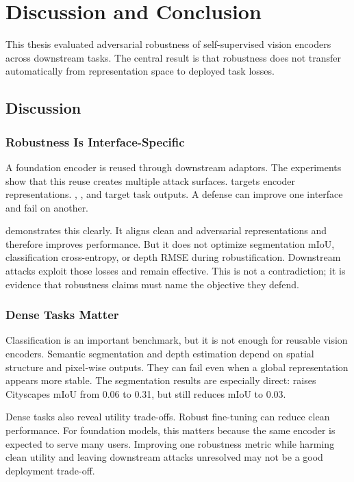 \chapter{Discussion and Conclusion}
\label{chap:discussion}

This thesis evaluated adversarial robustness of self-supervised vision encoders across downstream tasks. The central result is that robustness does not transfer automatically from representation space to deployed task losses.

\section{Discussion}

\subsection{Robustness Is Interface-Specific}

A foundation encoder is reused through downstream adaptors. The experiments show that this reuse creates multiple attack surfaces. \EmbedAttack targets encoder representations. \PGD, \SegPGD, and \DepthPGD target task outputs. A defense can improve one interface and fail on another.

\DeACL demonstrates this clearly. It aligns clean and adversarial representations and therefore improves \EmbedAttack performance. But it does not optimize segmentation mIoU, classification cross-entropy, or depth RMSE during robustification. Downstream attacks exploit those losses and remain effective. This is not a contradiction; it is evidence that robustness claims must name the objective they defend.

\subsection{Dense Tasks Matter}

Classification is an important benchmark, but it is not enough for reusable vision encoders. Semantic segmentation and depth estimation depend on spatial structure and pixel-wise outputs. They can fail even when a global representation appears more stable. The segmentation results are especially direct: \DeACL raises Cityscapes \EmbedAttack mIoU from 0.06 to 0.31, but \SegPGD still reduces mIoU to 0.03.

Dense tasks also reveal utility trade-offs. Robust fine-tuning can reduce clean performance. For foundation models, this matters because the same encoder is expected to serve many users. Improving one robustness metric while harming clean utility and leaving downstream attacks unresolved may not be a good deployment trade-off.

